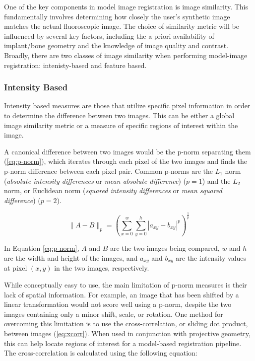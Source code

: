 One of the key components in model image registration is image similarity.
This fundamentally involves determining how closely the user's synthetic image matches the actual fluoroscopic image.
The choice of similarity metric will be influenced by several key factors, including the a-priori availability of implant/bone geometry and the knowledge of image quality and contrast.
Broadly, there are two classes of image similarity when performing model-image registration: intenisty-based and feature based.

\subsubsection{Intensity Based}
\label{sec:img-sim-intensity}
Intensity based measures are those that utilize specific pixel information in order to determine the difference between two images.
This can be either a global image similarity metric or a measure of specific regions of interest within the image.

A canonical difference between two images would be the p-norm separating them (\cref{eq:p-norm}), which iterates through each pixel of the two images and finds the p-norm difference between each pixel pair.
Common p-norms are the $L_1$ norm (\emph{absolute intensity differences} or \emph{mean absolute difference}) \cite{kanadeStereoMatchingAlgorithm1994} ($p=1$) and the $L_{2}$ norm, or Euclidean norm (\emph{squared intensity differences} or \emph{mean squared difference}) \cite{hannahComputerMatchingAreas1977}($p=2$).

\begin{equation}
    \|A-B\|_{p} = (\sum_{x=0}^{w}\sum_{y=0}^{h}|a_{xy}-b_{xy}|^{p})^{\frac{1}{p}}
    \label{eq:p-norm}
\end{equation}

In Equation \cref{eq:p-norm}, $A$ and $B$ are the two images being compared, $w$ and $h$ are the width and height of the images, and $a_{xy}$ and $b_{xy}$ are the intensity values at pixel $(x,y)$ in the two images, respectively.

While conceptually easy to use, the main limitation of p-norm measures is their lack of spatial information.
For example, an image that has been shifted by a linear transformation would not score well using a p-norm, despite the two images containing only a minor shift, scale, or rotation. One method for overcoming this limitation is to use the cross-correlation, or sliding dot product, between images \cite{bendatRandomDataAnalysis2010,hannahComputerMatchingAreas1977} (\cref{eq:xcorr}).
When used in conjunction with projective geometry, this can help locate regions of interest for a model-based registration pipeline.
The cross-correlation is calculated using the following equation:

